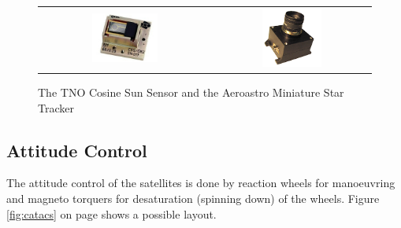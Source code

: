 \begin{figure} [h]
\centering
\begin{tabular}{c c}
\includegraphics[width = 0.4\textwidth, bb=0 0 240px 180px]{chapters/img/CoSS.jpg} & \includegraphics[width = 0.4\textwidth, bb=0 0 219px 215px]{chapters/img/MSTracker.png}
\end{tabular}
\caption[Sun sensor and star tracker]{The TNO Cosine Sun Sensor \cite{tnoweb} and the Aeroastro Miniature Star Tracker \cite{aeromst}}
\label{fig:sunstar}
\end{figure}


\subsection{Attitude Control}
\label{subsec:ACS}
The attitude control of the satellites is done by reaction wheels for manoeuvring and magneto torquers for desaturation (spinning down) of the wheels. Figure \ref{fig:catacs} on page \pageref{fig:catacs} shows a possible layout.

